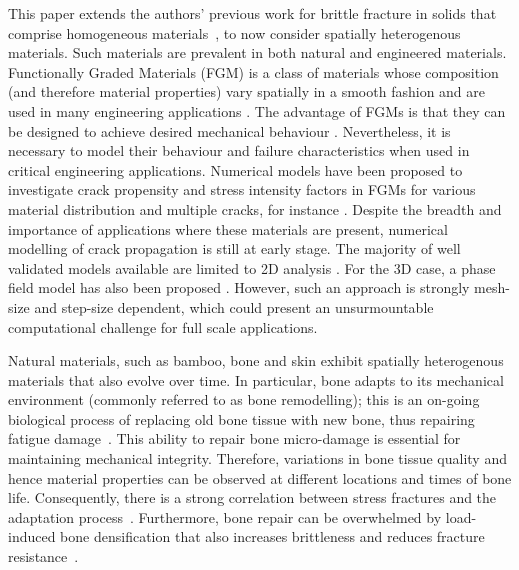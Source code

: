 \documentclass[onecolumn]{svjour3}
\begin{document}
This paper extends the authors' previous work for brittle fracture in solids that comprise homogeneous materials~\cite{kaczmarczyk2017energy}, 
to now consider spatially heterogenous materials. 
Such materials are prevalent in both natural and engineered materials. 
Functionally Graded Materials (FGM) is a class of materials whose composition (and therefore material properties) 
vary spatially in a smooth fashion \cite{KawasakiWatanabe1997} and are used in many engineering 
applications \cite{Jha2013, NaebeShirvan2016}.
The advantage of FGMs is that they can be designed to achieve desired mechanical behaviour \cite{Erdogan1995, FinotSuresh1996}. 
Nevertheless, it is necessary to model their behaviour and failure characteristics when used in critical engineering applications. 
Numerical models have been proposed to investigate crack propensity and stress intensity factors in FGMs for various material distribution 
and multiple cracks, for instance \cite{KimPaulino2002, Ayhan2009, ZhangBEM2011, ShiMan2014, ShojaeeDaneshmand2015}. 
Despite the breadth and importance of applications where these materials are present, 
numerical modelling of crack propagation is still at early stage.
The majority of well validated models available are limited to 2D analysis \cite{KimPaulino2004,Bayesteh2013, Ooi2015, Chafi2019}.
For the 3D case, a phase field model has also been proposed \cite{Hirshikesh2019}.
However, such an approach is strongly mesh-size and step-size dependent, 
which could present an unsurmountable computational challenge for full scale  applications.

Natural materials, such as bamboo, bone and skin exhibit spatially heterogenous materials that also evolve over time. 
In particular, bone adapts to its mechanical environment (commonly referred to as bone remodelling); 
this is an on-going biological process of replacing old bone tissue with new bone, thus repairing fatigue damage~\cite{hughes2017role}. 
This ability to repair bone micro-damage is essential for maintaining mechanical integrity. 
Therefore, variations in bone tissue quality and hence material properties can be observed at different locations and times of bone life. 
Consequently, there is a strong correlation between stress fractures and the adaptation process~\cite{hughes2017role}. 
Furthermore, bone repair can be overwhelmed by load-induced bone densification that also increases brittleness and reduces fracture resistance~\cite{loughridge2017qualitative}.
\end{document}
